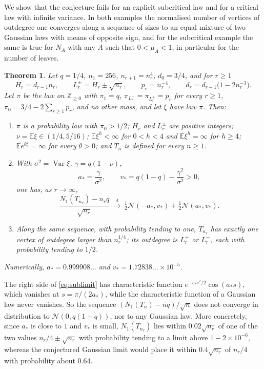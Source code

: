 \documentclass[11pt]{amsart}
\newtheorem{theorem}{Theorem}[section]
\theoremstyle{definition}
\newcommand{\Z}{\mathbb{Z}}
\newcommand{\E}{\mathbb{E}}
\newcommand{\Nor}{\mathcal{N}}
\DeclareMathOperator{\Var}{Var}
\begin{document}
We show that the conjecture fails for an explicit subcritical law and for a critical law with infinite variance. In both examples the normalised number of vertices of outdegree one converges along a sequence of sizes to an equal mixture of two Gaussian laws with means of opposite sign, and for the subcritical example the same is true for $N_A$ with any $A$ such that $0<\mu_A<1$, in particular for the number of leaves.

\begin{theorem}\label{thm:sub}
Let $q=1/4$, $n_1=256$, $n_{r+1}=n_r^4$, $d_0=3/4$, and for $r\ge1$
\begin{equation}\label{eq:law}
H_r=d_{r-1}n_r,\qquad L_r^{\pm}=H_r\pm\sqrt{n_r},\qquad p_r=n_r^{-4},\qquad d_r=d_{r-1}\big(1-2n_r^{-3}\big).
\end{equation}
Let $\pi$ be the law on $\Z_{\ge0}$ with $\pi_1=q$, $\pi_{L_r^-}=\pi_{L_r^+}=p_r$ for every $r\ge1$, $\pi_0=3/4-2\sum_{r\ge1}p_r$, and no other mass, and let $\xi$ have law $\pi$. Then:
\begin{enumerate}
\item[(i)] $\pi$ is a probability law with $\pi_0>1/2$; $H_r$ and $L_r^\pm$ are positive integers; $\nu=\E\xi\in(1/4,5/16)$; $\E\xi^h<\infty$ for $0<h<4$ and $\E\xi^h=\infty$ for $h\ge4$; $\E e^{\theta\xi}=\infty$ for every $\theta>0$; and $T_n$ is defined for every $n\ge1$.
\item[(ii)] With $\sigma^2=\Var\xi$, $\gamma=q(1-\nu)$,
\begin{equation}\label{eq:consts}
a_*=\frac{\gamma}{\sigma^2},\qquad v_*=q(1-q)-\frac{\gamma^2}{\sigma^2}>0,
\end{equation}
one has, as $r\to\infty$,
\begin{equation}\label{eq:sublimit}
\frac{N_1(T_{n_r})-n_rq}{\sqrt{n_r}}\ \xrightarrow{d}\ \tfrac12\Nor(-a_*,v_*)+\tfrac12\Nor(a_*,v_*).
\end{equation}
\item[(iii)] Along the same sequence, with probability tending to one, $T_{n_r}$ has exactly one vertex of outdegree larger than $n_r^{1/4}$; its outdegree is $L_r^+$ or $L_r^-$, each with probability tending to $1/2$.
\end{enumerate}
Numerically, $a_*=0.999908\ldots$ and $v_*=1.72838\ldots\times10^{-5}$.
\end{theorem}

The right side of \eqref{eq:sublimit} has characteristic function $e^{-v_*s^2/2}\cos(a_*s)$, which vanishes at $s=\pi/(2a_*)$, while the characteristic function of a Gaussian law never vanishes. So the sequence $(N_1(T_n)-nq)/\sqrt n$ does not converge in distribution to $\Nor(0,q(1-q))$, nor to any Gaussian law. More concretely, since $a_*$ is close to $1$ and $v_*$ is small, $N_1(T_{n_r})$ lies within $0.02\sqrt{n_r}$ of one of the two values $n_r/4\pm\sqrt{n_r}$ with probability tending to a limit above $1-2\times10^{-6}$, whereas the conjectured Gaussian limit would place it within $0.4\sqrt{n_r}$ of $n_r/4$ with probability about $0.64$.
\end{document}
